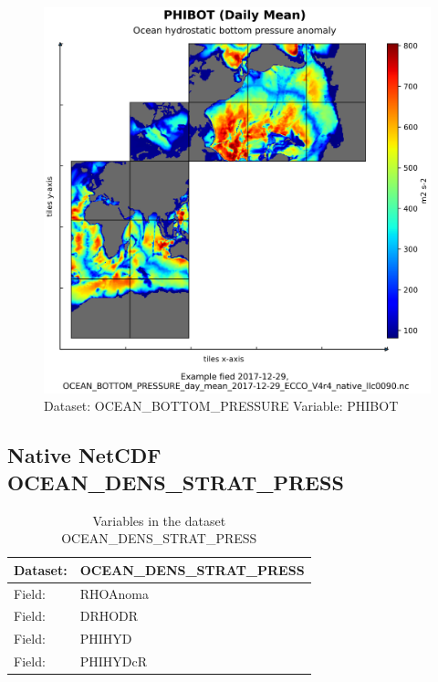 \begin{figure}[H]
\centering
\includegraphics[scale=0.55]{../images/plots/native_plots/Ocean_Bottom_Pressure/PHIBOT.png}
\caption{Dataset: OCEAN\_BOTTOM\_PRESSURE Variable: PHIBOT}
\label{tab:table-OCEAN_BOTTOM_PRESSURE_PHIBOT-Plot}
\end{figure}
\pagebreak
\subsection{Native NetCDF OCEAN\_DENS\_STRAT\_PRESS}
\newp
\begin{longtable}{|p{}|p{}|}
\caption{Variables in the dataset OCEAN\_DENS\_STRAT\_PRESS}
\label{tab:table-OCEAN_DENS_STRAT_PRESS-fields} \\ 
\hline \endhead \hline \endfoot
\rowcolor{lightgray} \textbf{Dataset:} & \textbf{OCEAN\_DENS\_STRAT\_PRESS} \\ \hline
Field: &RHOAnoma \\ \hline
Field: &DRHODR \\ \hline
Field: &PHIHYD \\ \hline
Field: &PHIHYDcR \\ \hline
\end{longtable}

\pagebreak
